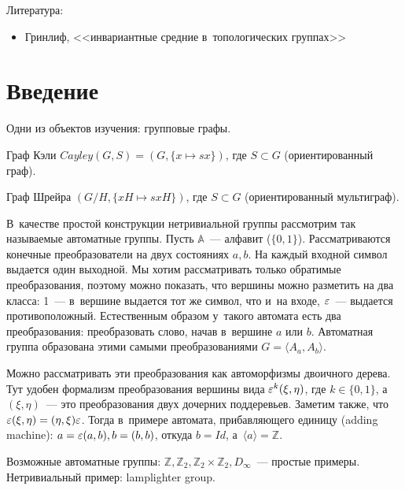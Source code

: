 \documentclass{article}
\begin{document}
Литература:
\begin{itemize}
	\item Гринлиф, <<инвариантные средние в~топологических группах>>
\end{itemize}

\section{Введение}

Одни из объектов изучения: групповые графы.

\begin{definition}
	Граф Кэли $Cayley(G, S) = (G, \{x \mapsto sx\})$, где $S \subset G$ (ориентированный граф).
\end{definition}

\begin{definition}
	Граф Шрейра $(G / H, \{xH \mapsto sxH\})$, где $S \subset G$ (ориентированный мультиграф).
\end{definition}

В~качестве простой конструкции нетривиальной группы рассмотрим так называемые автоматные группы.
Пусть $\mathbb{A}$~--- алфавит ($\{0, 1\}$). Рассматриваются конечные преобразователи на двух
состояниях $a, b$. На каждый входной символ выдается один выходной.  Мы хотим рассматривать только
обратимые преобразования, поэтому можно показать, что вершины можно разметить на два класса:
1~--- в~вершине выдается тот же символ, что и~на входе, $\varepsilon$~--- выдается противоположный.
Естественным образом у~такого автомата есть два преобразования: преобразовать слово, начав
в~вершине $a$ или $b$. Автоматная группа образована этими самыми преобразованиями
$G = \langle A_a, A_b \rangle$.

Можно рассматривать эти преобразования как автоморфизмы двоичного дерева. Тут удобен формализм
преобразования вершины вида $\varepsilon^k (\xi, \eta)$, где $k \in \{0, 1\}$, а~$(\xi, \eta)$~--- это
преобразования двух дочерних поддеревьев. Заметим также, что $\varepsilon(\xi, \eta) = (\eta, \xi) \varepsilon$.
Тогда в~примере автомата, прибавляющего единицу (adding machine): $a = \varepsilon (a, b), b = (b, b)$,
откуда $b = Id$, а~$\langle a \rangle = \mathbb{Z}$.

Возможные автоматные группы: $\mathbb{Z}, \mathbb{Z}_2, \mathbb{Z}_2 \times \mathbb{Z}_2,
D_\infty$~--- простые примеры. Нетривиальный пример: lamplighter group.
\end{document}
